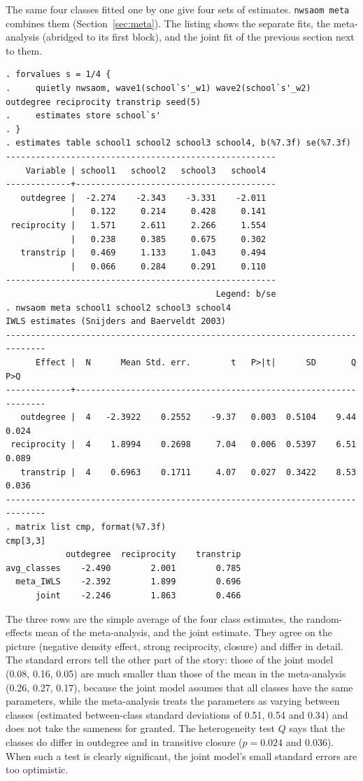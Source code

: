 The same four classes fitted one by one give four sets of estimates. \texttt{nwsaom meta} combines them (Section~\ref{sec:meta}). The listing shows the separate fits, the meta-analysis (abridged to its first block), and the joint fit of the previous section next to them.
\begin{lstlisting}
. forvalues s = 1/4 {
.     quietly nwsaom, wave1(school`s'_w1) wave2(school`s'_w2) outdegree reciprocity transtrip seed(5)
.     estimates store school`s'
. }
. estimates table school1 school2 school3 school4, b(%7.3f) se(%7.3f)
------------------------------------------------------
    Variable | school1   school2   school3   school4
-------------+----------------------------------------
   outdegree |  -2.274    -2.343    -3.331    -2.011
             |   0.122     0.214     0.428     0.141
 reciprocity |   1.571     2.611     2.266     1.554
             |   0.238     0.385     0.675     0.302
   transtrip |   0.469     1.133     1.043     0.494
             |   0.066     0.284     0.291     0.110
------------------------------------------------------
                                          Legend: b/se
. nwsaom meta school1 school2 school3 school4
IWLS estimates (Snijders and Baerveldt 2003)
------------------------------------------------------------------------------
      Effect |  N      Mean Std. err.        t   P>|t|      SD       Q     P>Q
-------------+----------------------------------------------------------------
   outdegree |  4   -2.3922    0.2552    -9.37   0.003  0.5104    9.44   0.024
 reciprocity |  4    1.8994    0.2698     7.04   0.006  0.5397    6.51   0.089
   transtrip |  4    0.6963    0.1711     4.07   0.027  0.3422    8.53   0.036
------------------------------------------------------------------------------
. matrix list cmp, format(%7.3f)
cmp[3,3]
            outdegree  reciprocity    transtrip
avg_classes    -2.490        2.001        0.785
  meta_IWLS    -2.392        1.899        0.696
      joint    -2.246        1.863        0.466
\end{lstlisting}
The three rows are the simple average of the four class estimates, the random-effects mean of the meta-analysis, and the joint estimate. They agree on the picture (negative density effect, strong reciprocity, closure) and differ in detail. The standard errors tell the other part of the story: those of the joint model (0.08, 0.16, 0.05) are much smaller than those of the mean in the meta-analysis (0.26, 0.27, 0.17), because the joint model assumes that all classes have the same parameters, while the meta-analysis treats the parameters as varying between classes (estimated between-class standard deviations of 0.51, 0.54 and 0.34) and does not take the sameness for granted. The heterogeneity test $Q$ says that the classes do differ in outdegree and in transitive closure ($p=0.024$ and $0.036$). When such a test is clearly significant, the joint model's small standard errors are too optimistic.

